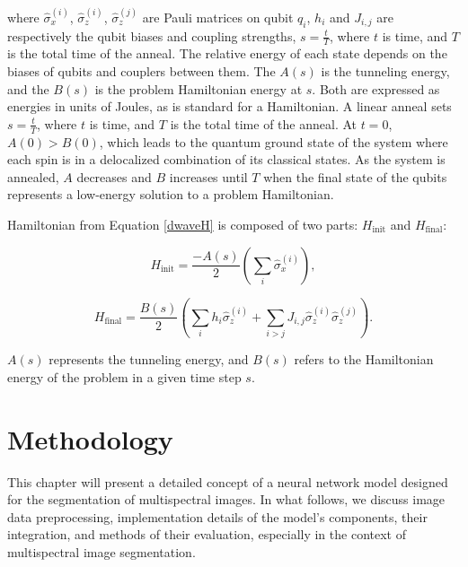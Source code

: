 \documentclass[a4paper,12pt]{article}
\begin{document}
\noindent where $\widehat {\sigma }_x^{\left(i\right)}$, $\widehat {\sigma }_z^{\left(i\right)}$, $\widehat {\sigma
}_z^{\left(j\right)}$ are Pauli matrices on qubit $q_i$, $h_i$ and $J_{i,j}$ are respectively the qubit biases and coupling strengths, $s = \frac{t}{T}$, where $t$ is time, and $T$ is the total time of the anneal. The relative energy of each state depends on the biases of qubits and couplers between them. The $A(s)$ is the tunneling energy, and the $B(s)$ is the problem Hamiltonian energy at $s$. Both are expressed as energies in units of Joules, as is standard for a Hamiltonian. A linear anneal sets $s = \frac{t}{T}$, where $t$ is time, and $T$ is the total time of the anneal. At $t = 0$, $A(0) > B(0)$, which leads to the quantum ground state of the system where each spin is in a delocalized combination of its classical states. As the system is annealed, $A$ decreases and $B$ increases until $T$ when the final state of the qubits represents a low-energy solution to a problem Hamiltonian.

Hamiltonian from Equation \eqref{dwaveH} is composed of two parts: 
$H_{\mathrm{init}}$ and $H_{\mathrm{final}}$:

\begin{equation}\label{DWaveHinit}
    H_{\mathrm{init}}=\frac{-A\left(s\right)} 2\left(\sum _i\widehat {\sigma }_x^{\left(i\right)}\right),
\end{equation}

\begin{equation}\label{DWaveHfinal}
    H_{\mathrm{final}}=\frac{B(s)} 2\left(\sum _ih_i\widehat {\sigma }_z^{\left(i\right)}+\sum _{i>j}J_{i,j}\widehat
{\sigma }_z^{\left(i\right)}\widehat {\sigma }_z^{\left(j\right)}\right).
\end{equation}

\noindent  $A(s)$ represents the tunneling energy, and $B(s)$ refers to the Hamiltonian energy of the problem in a given time step $s$.

\section{Methodology}\label{methodology}
This chapter will present a detailed concept of a neural network model designed for the segmentation of multispectral images. In what follows, we discuss image data preprocessing, implementation details of the model's components, their integration, and methods of their evaluation, especially in the context of multispectral image segmentation.
\end{document}
